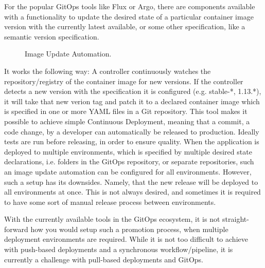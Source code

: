 For the popular GitOps tools like Flux or Argo,
there are components available with a functionality to update the desired state
of a particular container image version with the currently latest available, or some other specification, like a semantic version specification.

\begin{figure}[h]
	\centering
	\caption{Image Update Automation.
	}
	\label{fig:image-update-automation-illustration}	
\end{figure}

It works the following way: A controller continuously watches the repository/registry of the container image for new versions.
If the controller detects a new version with the specification it is configured (e.g. stable-*, 1.13.*),
it will take that new verion tag and patch it to a declared container image which is specified in one or more YAML files in a Git repository.
This tool makes it possible to achieve simple Continuous Deployment,
meaning that a commit, a code change, by a developer can automatically be released to production.
Ideally tests are run before releasing, in order to ensure quality.
When the application is deployed to multiple environments, which is specified by multiple desired state declarations,
i.e. folders in the GitOps repository, or separate repositories,
such an image update automation can be configured for all environments.
However, such a setup has its downsides.
Namely, that the new release will be deployed to all environments at once.
This is not always desired, and sometimes it is required to have some sort of manual release process between environments.

With the currently available tools in the GitOps ecosystem,
it is not straight-forward how you would setup such a promotion process,
when multiple deployment environments are required.
While it is not too difficult to achieve with push-based deployments and a synchronous workflow/pipeline,
it is currently a challenge with pull-based deployments and GitOps.

